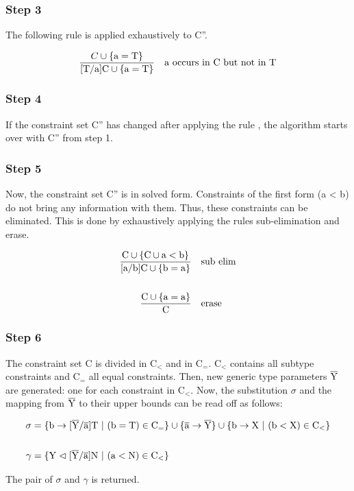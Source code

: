 \subsubsection{Step 3}
The following rule is applied exhaustively to C''.

\begin{align*}
    \frac{C \cup \{ \text{a} = \text{T} \}}{ \text{[T/a]C} \cup \{ \text{a} = \text{T} \} } \quad \text{a occurs in C but not in T}
\end{align*}

\subsubsection{Step 4}
If the constraint set C'' has changed after applying the rule , the algorithm starts over with C'' from step 1.

\subsubsection{Step 5}
Now, the constraint set C'' is in solved form. Constraints of the first form (a < b) do not bring any information with them. Thus, these constraints can be eliminated.
This is done by exhaustively applying the rules sub-elimination and erase.

\begin{align*}
    \frac{\text{C} \cup \{ \text{C} \cup \text{a} < \text{b} \}}{ \text{[a/b]C} \cup \{ \text{b} = \text{a} \} } \quad &\text{sub elim}
    \\
    \\
    \frac{\text{C} \cup \{ \text{a} = \text{a} \} }{ \text{C} } \quad &\text{erase}
\end{align*}

\subsubsection{Step 6}
The constraint set C is divided in $\text{C}_<$ and in $\text{C}_=$. $\text{C}_<$ contains all subtype constraints and $\text{C}_=$ all equal constraints.
Then, new generic type parameters $\overline{\text{Y}}$ are generated: one for each constraint in $\text{C}_<$. Now, the substitution $\sigma$ and the mapping from $\overline{\text{Y}}$ to their upper bounds can be read off as follows:

\begin{align*}
    \sigma &= \{ \text{b} \to \tsxsn{Y}{a}{T} \ | \ (\text{b} = \text{T}) \in \text{C}_= \} \cup \{ \ot{a} \to \ot{Y} \} \cup \{ \text{b} \to \text{X} \ | \ (\text{b} < \text{X}) \in \text{C}_< \}\\
    \\
    \gamma &= \{ \text{Y} \vartriangleleft \tsxsn{Y}{a}{N} \ | \ (\text{a} < \text{N}) \in \text{C}_< \}\\
\end{align*}

The pair of $\sigma$ and $\gamma$ is returned.
